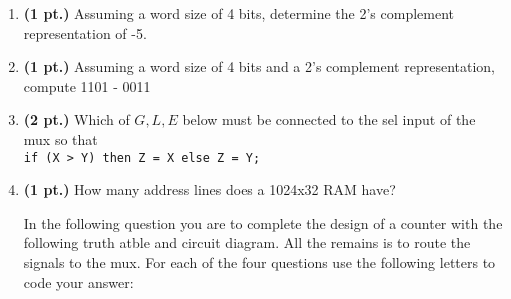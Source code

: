 \documentclass{article}
\begin{document}
\begin{enumerate}
\item {\bf (1 pt.)} Assuming a word size of 4 bits, determine the 2's complement
representation of -5.

\item {\bf (1 pt.)} Assuming a word size of 4 bits and a 2's complement representation,
compute  1101 - 0011

\pagebreak
\item {\bf (2 pt.)} Which of $G,L,E$ below must be connected to the 
sel input of the mux so that \\
\verb+if (X > Y) then Z = X else Z = Y;+



\item {\bf (1 pt.)} How many address lines does a 1024x32 RAM have?

\pagebreak
In the following question you are to complete the design of a counter with
the following truth atble and circuit diagram.  All the remains is to route
the signals to the mux.  For each of the four questions use the following 
letters to code your answer:


\end{enumerate}
\end{document}
